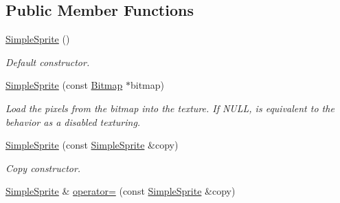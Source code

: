 \subsection*{Public Member Functions}
\begin{DoxyCompactItemize}
\item 
\hypertarget{class_f2_c_1_1_simple_sprite_ae3616dd933524b2aa481d20e2f954e91}{
\hyperlink{class_f2_c_1_1_simple_sprite_ae3616dd933524b2aa481d20e2f954e91}{SimpleSprite} ()}
\label{class_f2_c_1_1_simple_sprite_ae3616dd933524b2aa481d20e2f954e91}

\begin{DoxyCompactList}\small\item\em Default constructor. \item\end{DoxyCompactList}\item 
\hyperlink{class_f2_c_1_1_simple_sprite_a47a25751dcc327438aebf044bafb566d}{SimpleSprite} (const \hyperlink{class_f2_c_1_1_bitmap}{Bitmap} $\ast$bitmap)
\begin{DoxyCompactList}\small\item\em Load the pixels from the bitmap into the texture. If NULL, is equivalent to the behavior as a disabled texturing. \item\end{DoxyCompactList}\item 
\hypertarget{class_f2_c_1_1_simple_sprite_a2449ff78a09f748094bc2a75df69eaba}{
\hyperlink{class_f2_c_1_1_simple_sprite_a2449ff78a09f748094bc2a75df69eaba}{SimpleSprite} (const \hyperlink{class_f2_c_1_1_simple_sprite}{SimpleSprite} \&copy)}
\label{class_f2_c_1_1_simple_sprite_a2449ff78a09f748094bc2a75df69eaba}

\begin{DoxyCompactList}\small\item\em Copy constructor. \item\end{DoxyCompactList}\item 
\hypertarget{class_f2_c_1_1_simple_sprite_aebf2619b56afa24816fdf95f236d5790}{
\hyperlink{class_f2_c_1_1_simple_sprite}{SimpleSprite} \& \hyperlink{class_f2_c_1_1_simple_sprite_aebf2619b56afa24816fdf95f236d5790}{operator=} (const \hyperlink{class_f2_c_1_1_simple_sprite}{SimpleSprite} \&copy)}
\label{class_f2_c_1_1_simple_sprite_aebf2619b56afa24816fdf95f236d5790}


\end{DoxyCompactItemize}

